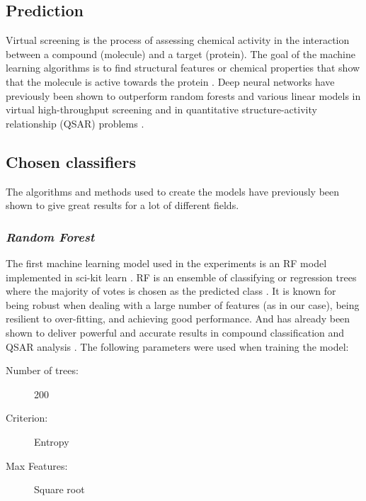 \documentclass[\ifafour a4paper,12pt,\else a5paper,10pt,\fi%
onecolumn,oneside,article,%
british%
]{memoir}
\theoremstyle{remark}
\theoremstyle{innote}
\renewcommand*{\|}[1][]{\nonscript\:#1\vert\nonscript\:\mathopen{}}
\begin{document}
\subsection{Prediction}

Virtual screening is the process of assessing chemical activity in the interaction between a compound (molecule) and a target (protein). The goal of the machine learning algorithms is to find structural features or chemical properties that show that the molecule is active towards the protein \autocites{green2019}. Deep neural networks have previously been shown to outperform random forests and various linear models in virtual high-throughput screening and in quantitative structure-activity relationship (QSAR) problems \autocite{koutsoukasetal2017}.
  
\subsection{Chosen classifiers} 

The algorithms and methods used to create the models have previously been shown to give great results for a lot of different fields.

\subsubsection{\textit{Random Forest}}

The first machine learning model used in the experiments is an RF model implemented in sci-kit learn \autocites{pedregosaetal2011}. RF is an ensemble of classifying or regression trees where the majority of votes is chosen as the predicted class \autocites{breiman2001b}. It is known for being robust when dealing with a large number of features (as in our case), being resilient to over-fitting, and achieving good performance. And has already been shown to deliver powerful and accurate results in compound classification and QSAR analysis \autocites{svetniketal2003}. The following parameters were used when training the model: 

\medskip

\begin{framed}
  \begin{description}
  \item[Number of trees:] 200 
  \item[Criterion:] Entropy 
  \item[Max Features:] Square root
  \end{description}
\end{framed}
\end{document}
